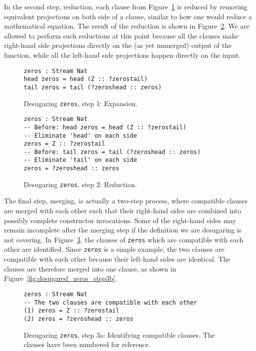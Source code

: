 In the second step, reduction, each clause from
Figure~\ref{fig:desugared_zeros_step1} is reduced by removing equivalent
projections on both side of a clause, similar to how one would reduce a
mathematical equation. The result of the reduction is shown in
Figure~\ref{fig:desugared_zeros_step2}. We are allowed to perform such
reductions at this point because all the clauses make right-hand side
projections directly on the (as yet unmerged) output of the function, while all
the left-hand side projections happen directly on the input.

\begin{figure}
\begin{lstlisting}[mathescape]
zeros : Stream Nat
head zeros = head (Z :: ?zerostail)
tail zeros = tail (?zeroshead :: zeros)
\end{lstlisting}
  \caption{Desugaring \texttt{zeros}, step 1: Expansion.}
  \label{fig:desugared_zeros_step1}
\end{figure}

\begin{figure}
\begin{lstlisting}[mathescape]
zeros : Stream Nat
-- Before: head zeros = head (Z :: ?zerostail)
-- Eliminate 'head' on each side
zeros = Z :: ?zerostail
-- Before: tail zeros = tail (?zeroshead :: zeros)
-- Eliminate 'tail' on each side
zeros = ?zeroshead :: zeros
\end{lstlisting}
  \caption{Desugaring \texttt{zeros}, step 2: Reduction.}
  \label{fig:desugared_zeros_step2}
\end{figure}

The final step, merging, is actually a two-step process, where compatible clauses are
merged with each other such that their right-hand sides are combined into
possibly complete constructor invocations. Some of the right-hand sides may remain
incomplete after the merging step if the definition we are desugaring is not
covering. In Figure~\ref{fig:desugared_zeros_step3a}, the clauses of
\texttt{zeros} which are compatible with each other are identified. Since
\texttt{zeros} is a simple example, the two clauses are compatible with each
other because their left-hand sides are identical. The clauses are
therefore merged into one clause, as shown in Figure~\ref{fig:desugared_zeros_step3b}.

\begin{figure}
\begin{lstlisting}[mathescape]
zeros : Stream Nat
-- The two clauses are compatible with each other
(1) zeros = Z :: ?zerostail
(2) zeros = ?zeroshead :: zeros
\end{lstlisting}
  \caption{Desugaring \texttt{zeros}, step 3a: Identifying compatible
    clauses. The clauses have been numbered for reference.}
  \label{fig:desugared_zeros_step3a}
\end{figure}

